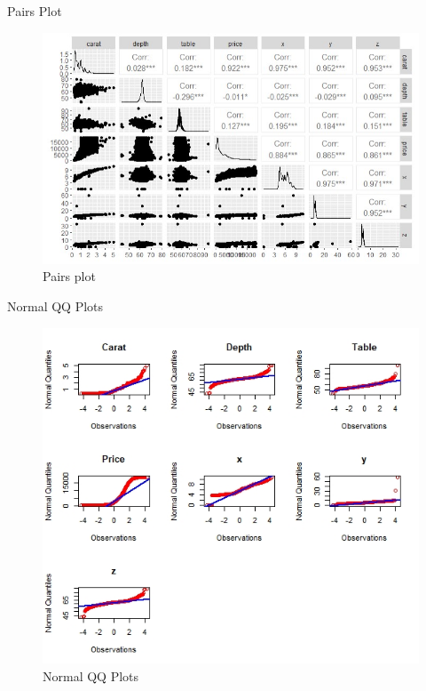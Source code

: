 \documentclass[
  ignorenonframetext,
]{beamer}
\begin{document}
\begin{frame}{Pairs Plot}
\protect\hypertarget{pairs-plot}{}
\begin{figure}
\centering
\includegraphics{./pairs plot.jpg}
\caption{Pairs plot}
\end{figure}
\end{frame}

\begin{frame}{Normal QQ Plots}
\protect\hypertarget{normal-qq-plots}{}
\begin{figure}
\centering
\includegraphics[width=\textwidth,height=0.85\textheight]{./Normal QQ Plots.jpeg}
\caption{Normal QQ Plots}
\end{figure}
\end{frame}
\end{document}

